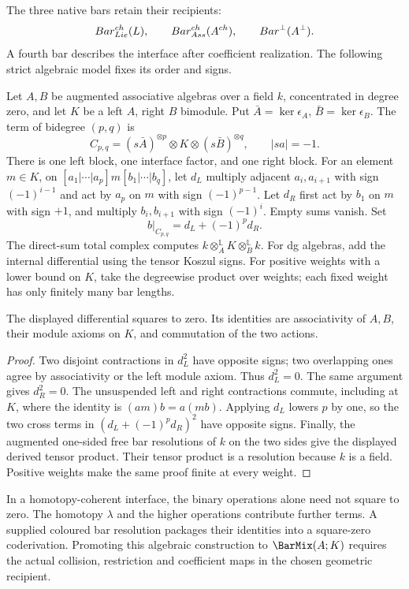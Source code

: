 The three native bars retain their recipients:
\[
 Bar^{ch}_{Lie}(L),\qquad Bar^{ch}_{Ass}(A^{ch}),\qquad Bar^{\perp}(A^\perp).
\]
A fourth bar describes the interface after coefficient realization. The
following strict algebraic model fixes its order and signs.

\begin{construction}
Let $A,B$ be augmented associative algebras over a field $k$, concentrated
in degree zero, and let $K$ be a left $A$, right $B$ bimodule. Put
$\bar A=\ker\epsilon_A$, $\bar B=\ker\epsilon_B$. The term of bidegree
$(p,q)$ is
\[
 C_{p,q}=(s\bar A)^{\otimes p}\otimes K\otimes(s\bar B)^{\otimes q},
 \qquad |s a|=-1.
\]
There is one left block, one interface factor, and one right block.
For an element $m\in K$, on $[a_1|\cdots|a_p]m[b_1|\cdots|b_q]$, let $d_L$ multiply adjacent
$a_i,a_{i+1}$ with sign $(-1)^{i-1}$ and act by $a_p$ on $m$ with sign
$(-1)^{p-1}$. Let $d_R$ first act by $b_1$ on $m$ with sign $+1$, and
multiply $b_i,b_{i+1}$ with sign $(-1)^i$. Empty sums vanish. Set
\[
 b|_{C_{p,q}}=d_L+(-1)^p d_R.
\]
The direct-sum total complex computes
$k\otimes_A^{\mathbb L}K\otimes_B^{\mathbb L}k$.
For dg algebras, add the internal differential using the tensor Koszul signs.
For positive weights with a lower bound on $K$, take the degreewise product
over weights; each fixed weight has only finitely many bar lengths.
\end{construction}

\begin{theorem}
The displayed differential squares to zero. Its identities are associativity
of $A,B$, their module axioms on $K$, and commutation of the two actions.
\end{theorem}
\begin{proof}
Two disjoint contractions in $d_L^2$ have opposite signs; two overlapping
ones agree by associativity or the left module axiom. Thus $d_L^2=0$.
The same argument gives $d_R^2=0$. The unsuspended left and right
contractions commute, including at $K$, where the identity is
$(am)b=a(mb)$. Applying $d_L$ lowers $p$ by one, so the two cross terms
in $(d_L+(-1)^p d_R)^2$ have opposite signs. Finally, the augmented
one-sided free bar resolutions of $k$ on the two sides give the displayed
derived tensor product. Their tensor product is a resolution because $k$
is a field. Positive weights make the same proof finite at every weight.
\end{proof}

In a homotopy-coherent interface, the binary operations alone need not square
to zero. The homotopy $\lambda$ and the higher operations contribute further
terms. A supplied coloured bar resolution packages their identities into
a square-zero coderivation. Promoting this algebraic construction to
$\BarMix(\mathbb A;K)$ requires the actual collision, restriction and
coefficient maps in the chosen geometric recipient.

